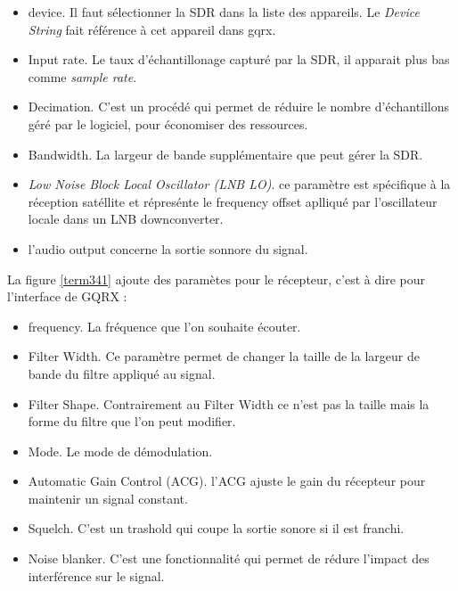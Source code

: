 \begin{itemize}
\item device. Il faut sélectionner la SDR dans la liste des appareils. Le \textit{Device String} fait référence à cet appareil dans gqrx.
\item Input rate. Le taux d'échantillonage capturé par la SDR, il apparait plus bas comme \textit{sample rate}.
\item Decimation. C'est un procédé qui permet de réduire le nombre d'échantillons géré par le logiciel, pour économiser des ressources.
\item Bandwidth. La largeur de bande supplémentaire que peut gérer la SDR.
\item \textit{Low Noise Block Local Oscillator (LNB LO)}. ce paramètre est spécifique à la réception satéllite et répresénte le frequency offset aplliqué par l'oscillateur locale dans un LNB downconverter.
\item l'audio output concerne la sortie sonnore du signal.
\end{itemize}

La figure \ref{term341} ajoute des paramètes pour le récepteur, c'est à dire pour l'interface de GQRX :

\begin{itemize}
\item frequency. La fréquence que l'on souhaite écouter.
\item Filter Width. Ce paramètre permet de changer la taille de la largeur de bande du filtre appliqué au signal.
\item Filter Shape. Contrairement au Filter Width ce n'est pas la taille mais la forme du filtre que l'on peut modifier.
\item Mode. Le mode de démodulation.
\item Automatic Gain Control (ACG). l'ACG ajuste le gain du récepteur pour maintenir un signal constant.
\item Squelch. C'est un trashold qui coupe la sortie sonore si il est franchi.
\item Noise blanker. C'est une fonctionnalité qui permet de rédure l'impact des interférence sur le signal.
\end{itemize}

